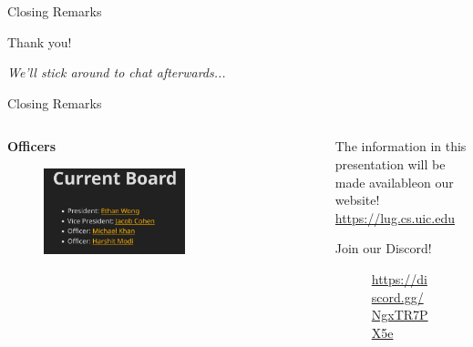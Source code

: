 \documentclass{beamer}
\begin{document}
\begin{frame}{Closing Remarks}
	\begin{center}
		{\Huge Thank you!}

		\textit{We'll stick around to chat afterwards...}
	\end{center}
\end{frame}

\begin{frame}{Closing Remarks}
	\begin{columns}
		\begin{column}{0.5\textwidth}
			\textbf{Officers}
			\begin{figure}
				\centering
				\includegraphics[width=0.60\textwidth]{officers.png}
			\end{figure}
		\end{column}
		\begin{column}{0.5\textwidth}
			The information in this presentation will be made
			available\footnotemark on our website!\\
			\url{https://lug.cs.uic.edu}

			\bigskip
			Join our Discord!

			\begin{figure}
				\centering
				
				\caption{\url{https://discord.gg/NgxTR7PX5e}}
			\end{figure}
		\end{column}
	\end{columns}

\end{frame}
\end{document}
